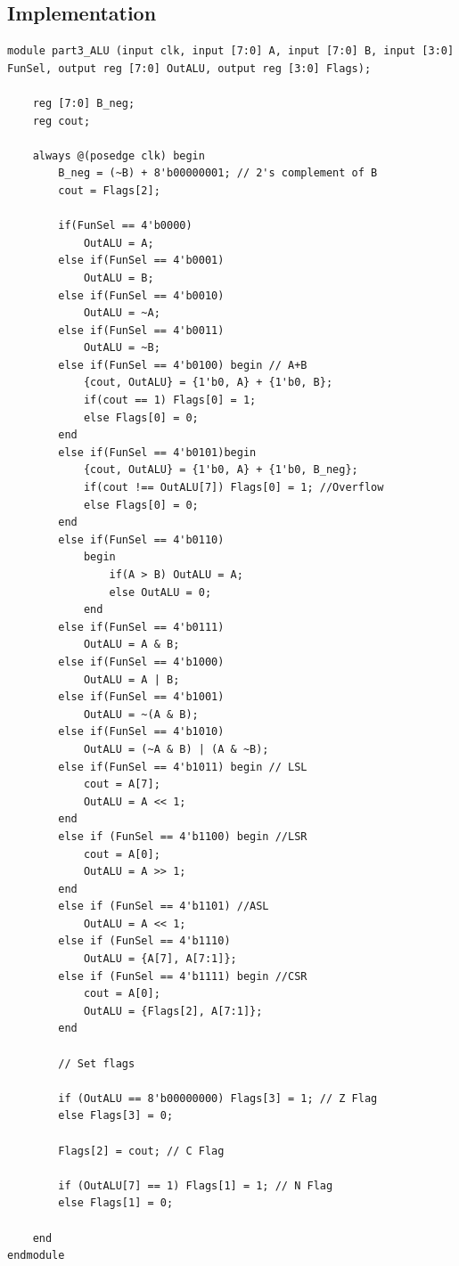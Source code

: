 \documentclass[pdftex,12pt,a4paper]{article}
\begin{document}
\subsection{Implementation}
\begin{lstlisting}
module part3_ALU (input clk, input [7:0] A, input [7:0] B, input [3:0] FunSel, output reg [7:0] OutALU, output reg [3:0] Flags);

    reg [7:0] B_neg;
    reg cout;

    always @(posedge clk) begin
        B_neg = (~B) + 8'b00000001; // 2's complement of B
        cout = Flags[2];

        if(FunSel == 4'b0000)
            OutALU = A;
        else if(FunSel == 4'b0001)
            OutALU = B;
        else if(FunSel == 4'b0010)
            OutALU = ~A;
        else if(FunSel == 4'b0011)
            OutALU = ~B;
        else if(FunSel == 4'b0100) begin // A+B
            {cout, OutALU} = {1'b0, A} + {1'b0, B};
            if(cout == 1) Flags[0] = 1;
            else Flags[0] = 0;
        end
        else if(FunSel == 4'b0101)begin
            {cout, OutALU} = {1'b0, A} + {1'b0, B_neg};
            if(cout !== OutALU[7]) Flags[0] = 1; //Overflow
            else Flags[0] = 0;
        end
        else if(FunSel == 4'b0110)
            begin
                if(A > B) OutALU = A;
                else OutALU = 0;
            end
        else if(FunSel == 4'b0111)
            OutALU = A & B;
        else if(FunSel == 4'b1000)
            OutALU = A | B;
        else if(FunSel == 4'b1001)
            OutALU = ~(A & B);
        else if(FunSel == 4'b1010)
            OutALU = (~A & B) | (A & ~B);
        else if(FunSel == 4'b1011) begin // LSL
            cout = A[7];
            OutALU = A << 1;
        end
        else if (FunSel == 4'b1100) begin //LSR
            cout = A[0];
            OutALU = A >> 1;
        end
        else if (FunSel == 4'b1101) //ASL
            OutALU = A << 1;
        else if (FunSel == 4'b1110)
            OutALU = {A[7], A[7:1]}; 
        else if (FunSel == 4'b1111) begin //CSR
            cout = A[0];
            OutALU = {Flags[2], A[7:1]};
        end

        // Set flags

        if (OutALU == 8'b00000000) Flags[3] = 1; // Z Flag
        else Flags[3] = 0;

        Flags[2] = cout; // C Flag

        if (OutALU[7] == 1) Flags[1] = 1; // N Flag
        else Flags[1] = 0;

    end
endmodule
\end{lstlisting}
\end{document}

